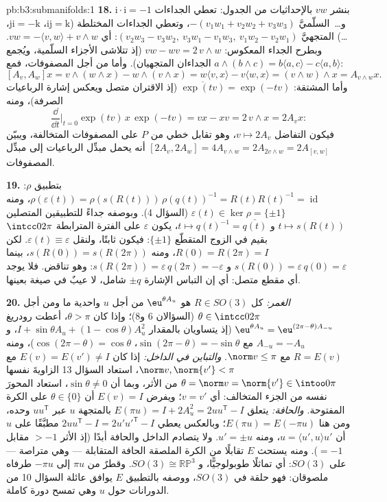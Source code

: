 \begin{solution}{pb:b3:submanifolds:1}
\textbf{18.} بنشر $vw$ بالإحداثيات من الجدول: تعطي الجداءات
$\mathrm i\cdot\mathrm i = -1$ و\dots\ السلّميَّ $-(v_1w_1 + v_2w_2 + v_3w_3)$، وتعطي الجداءات المختلطة
($\mathrm{ij} = \mathrm k$، $\mathrm{ji} =
-\mathrm k$، \dots) المتجهيَّ $(v_2w_3 - v_3w_2,\
v_3w_1 - v_1w_3,\ v_1w_2 - v_2w_1)$: أي $vw = -\langle v,
w\rangle + v\wedge w$.
وبطرح الجداء المعكوس: $vw - wv = 2\,v\wedge w$ (إذ تتلاشى الأجزاء السلّمية،
ويُجمع الجداءان المتجهيان). وأما من أجل المصفوفات، فمع $a\wedge(b\wedge
c) = b\langle a, c\rangle - c\langle a, b\rangle$:
\[
[A_v, A_w]x = v\wedge(w\wedge x) - w\wedge(v\wedge x)
= w\langle v, x\rangle - v\langle w, x\rangle
= (v\wedge w)\wedge x = A_{v\wedge w}x .
\]
وأما المشتقة: $\overline{\exp(tv)} = \exp(-tv)$ (إذ الاقتران متصل ويعكس إشارة الرباعيات
الصرفة)، ومنه
\[
\frac{\dd}{\dd t}\Bigr|_{t=0}\exp(tv)\,x\,\exp(-tv) = vx -
xv = 2\,v\wedge x = 2A_vx :
\]
فيكون التفاضل $v \mapsto 2A_v$، وهو تقابل خطي من $P$ على
المصفوفات المتخالفة، ويبيّن $[2A_v, 2A_w]
= 4A_{v\wedge w} = 2A_{2v\wedge w} = 2A_{[v,w]}$ أنه يحمل مبدِّل الرباعيات
إلى مبدِّل المصفوفات.

\textbf{19.} بتطبيق $\rho$: $\rho(\varepsilon(t)) =
\rho(s(R(t)))\,\rho(q(t))^{-1} = R(t)R(t)^{-1} =
\operatorname{id}$، ومنه $\varepsilon(t) \in \ker\rho =
\{\pm1\}$ (السؤال 4).
وبوصفه جداءً للتطبيقين المتصلين $t \mapsto s(R(t))$ و $t \mapsto q(t)^{-1} =
\bar{q(t)}$، يكون
$\varepsilon$  على الفترة المترابطة $\intcc0{2\pi}$ بقيم
في الزوج المتقطّع $\{\pm1\}$: فيكون ثابتًا، ولنقل $\varepsilon(t) \equiv
\varepsilon$. لكن
$R(0) = R(2\pi) = I$، ومنه $s(R(0)) =
s(R(2\pi))$، بينما $s(R(0)) = \varepsilon\,q(0) =
\varepsilon$ و $s(R(2\pi)) = \varepsilon\,q(2\pi) =
-\varepsilon$: وهو تناقض. فلا
يوجد أي مقطع متصل: أي إن التباس الإشارة $\pm q$ شامل، لا عيبٌ
في صيغة بعينها.

\textbf{20.} \emph{الغمر:} كل $R \in SO(3)$ هو $\eu^{\theta A_u}$ من أجل
$u$ واحدية ما ومن أجل $\theta \in
\intcc0{2\pi}$ (السؤالان 6 و8)؛ وإذا كان
$\theta > \pi$، أعطت رودريغ $\eu^{\theta A_u} = \eu^{(2\pi -
\theta)A_{-u}}$ (إذ يتساويان بالمقدار
$I + \sin\theta A_u + (1 -
\cos\theta)A_u^2$، و $A_{-u} = -A_u$ مع $\sin(2\pi -
\theta) = -\sin\theta$، $\cos(2\pi - \theta) =
\cos\theta$)، ومنه $R = E(v)$
مع $\norm v \leq \pi$. \emph{والتباين في الداخل:} إذا كان $E(v) = E(v') \neq I$ مع
$\norm v, \norm{v'} < \pi$، استعاد السؤال 13 الزاويةَ نفسها $\theta = \norm v = \norm{v'} \in \intoo0\pi$ من الأثر،
وبما أن $\sin\theta \neq 0$، استعاد المحورَ نفسه من الجزء المتخالف: أي
$v = v'$؛ ويفرض $E(v) = I$ أن $\theta \in \{0\}$ على الكرة المفتوحة.
\emph{والحافة:} يتعلق $E(\pi u) = I + 2A_u^2 = 2uu^{\mathsf T} - I$ بالمتجهة $u$ عبر $uu^{\mathsf T}$
وحده، ومن هنا $E(\pi u) =
E(-\pi u)$؛ وبالعكس يعطي $2uu^{\mathsf T} - I =
2u'u'^{\mathsf T} - I$ مطبَّقًا على $u$ أن
$u = \langle
u', u\rangle u'$، ومنه $u' = \pm u$. ولا يتصادم الداخل والحافة أبدًا
(إذ الأثر $> -1$ مقابل $= -1$). ومنه يستحث $E$ تقابلًا 
من الكرة الملصقة الحافة المتقابلة --- وهي متراصة --- على
$SO(3)$: أي تماثلًا طوبولوجيًّا، و $SO(3)
\cong \mathbb{RP}^3$. وقطرٌ من $\pi u$
إلى $-\pi u$ طرفاه ملصوقان: فهو حلقة في $SO(3)$، ووصفه
بالتطبيق $E$ يوافق عائلة السؤال 10 من الدورانات حول $u$ وهي
تمسح دورة كاملة.


\end{solution}
